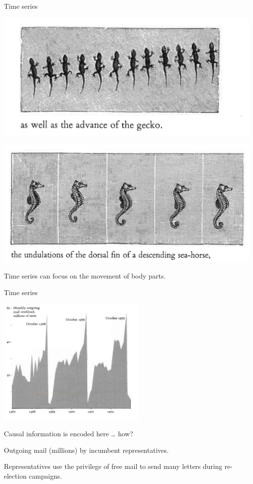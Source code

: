 \documentclass[
  ignorenonframetext,
]{beamer}
\begin{document}
\begin{frame}{Time series}
\protect\hypertarget{time-series-5}{}
\centering
\begin{minipage}{0.55\textwidth}
\centering
\includegraphics[width=\textwidth]{excellence_figs/fig_19.png}
\end{minipage}
\hfill
\begin{minipage}{0.55\textwidth}
\centering
\includegraphics[width=\textwidth]{excellence_figs/fig_18.png}
\end{minipage}

Time series can focus on the movement of body parts.
\end{frame}

\begin{frame}{Time series}
\protect\hypertarget{time-series-6}{}
\begin{center}
\includegraphics[width=0.55\textwidth]{excellence_figs/fig_20.png}
\end{center}

\footnotesize

Causal information is encoded here \ldots{} how?

Outgoing mail (millions) by incumbent representatives.

Representatives use the privilege of free mail to send many letters
during re-election campaigns.
\end{frame}
\end{document}
